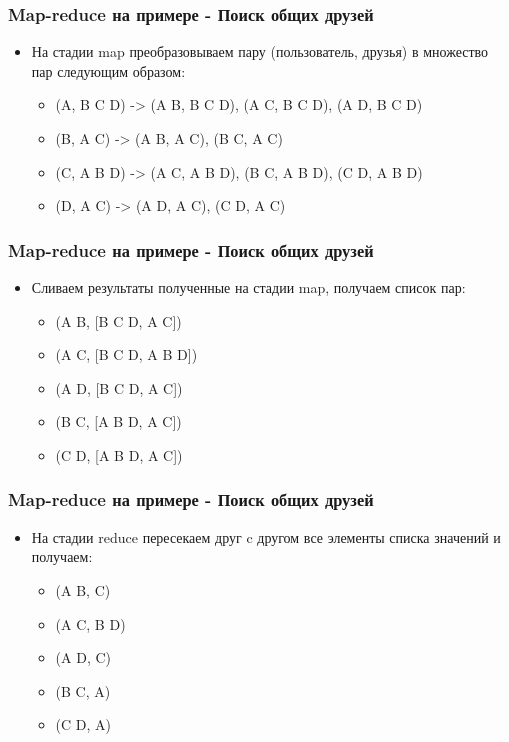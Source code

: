 \documentclass[utf8]{beamer}
\begin{document}
    \begin{frame}
    \frametitle{Map-reduce на примере - Поиск общих друзей}
        \begin{itemize}
            \item На стадии map преобразовываем пару (пользователь, друзья) в множество пар следующим образом:
            \begin{itemize}
                \item (A, B C D) -> (A B, B C D), (A C, B C D), (A D, B C D)
                \item (B, A C) -> (A B, A C), (B C, A C)
                \item (C, A B D) -> (A C, A B D), (B C, A B D), (C D, A B D)
                \item (D, A C) -> (A D, A C), (C D, A C)
            \end{itemize}
        \end{itemize}
    \end{frame} 

    \begin{frame}
    \frametitle{Map-reduce на примере - Поиск общих друзей}
        \begin{itemize}
            \item Сливаем результаты полученные на стадии map, получаем список пар:
            \begin{itemize}
                \item (A B, [B C D, A C])
                \item (A C, [B C D, A B D])
                \item (A D, [B C D, A C])
                \item (B C, [A B D, A C])
                \item (C D, [A B D, A C])
            \end{itemize}
        \end{itemize}
    \end{frame} 

    \begin{frame}
    \frametitle{Map-reduce на примере - Поиск общих друзей}
        \begin{itemize}
            \item На стадии reduce пересекаем друг c другом все элементы списка значений и получаем:
            \begin{itemize}
                \item (A B, C)
                \item (A C, B D)
                \item (A D, C)
                \item (B C, A)
                \item (C D, A)
            \end{itemize}
        \end{itemize}
    \end{frame}
\end{document}
